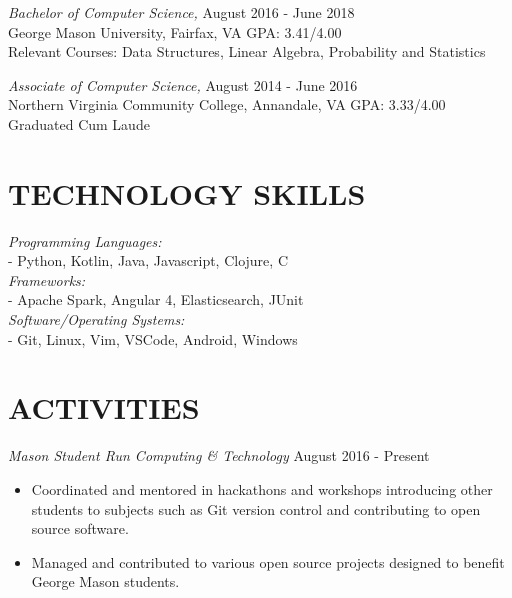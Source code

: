 \documentclass{res} %
\begin{document}
\begin{resume}
{\sl Bachelor of Computer Science,}  \hfill August 2016 - June 2018 \\
George Mason University, Fairfax, VA \hfill GPA: 3.41/4.00 \smallskip\\
Relevant Courses: Data Structures, Linear Algebra, Probability and Statistics

{\sl Associate of Computer Science,}  \hfill August 2014 - June 2016 \\
Northern Virginia Community College, Annandale, VA \hfill GPA: 3.33/4.00 \smallskip\\
Graduated Cum Laude
 

\section{TECHNOLOGY SKILLS} 

{\sl Programming Languages:} \\ \null\qquad - Python, Kotlin, Java, Javascript, Clojure, C \smallskip\\
{\sl Frameworks:} \\ \null\qquad - Apache Spark, Angular 4, Elasticsearch, JUnit \smallskip\\
{\sl Software/Operating Systems:} \\ \null\qquad - Git, Linux, Vim, VSCode, Android, Windows
 
 
\section{ACTIVITIES}

{\sl Mason Student Run Computing \& Technology} \hfill August 2016 - Present
\begin{itemize}
\item Coordinated and mentored in hackathons and workshops introducing other students to subjects such as Git version control and contributing to open source software.
\item Managed and contributed to various open source projects designed to benefit George Mason students.
\end{itemize} 


\end{resume}
\end{document}
